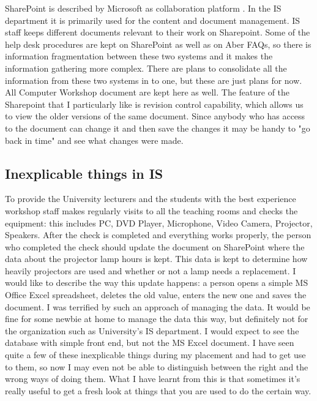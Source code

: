 \documentclass[10pt,a4paper,headinclude=true,twoside]{report}
\begin{document}
SharePoint is described by Microsoft as collaboration platform \cite{Sharepoint}. In the IS department it is primarily used  for the content and document management. IS staff keeps different documents relevant to their work on Sharepoint. Some of the help desk procedures are kept on SharePoint as well as on Aber FAQs, so there is information fragmentation between these two systems and it makes the information gathering more complex. There are plans to consolidate all the information from these two systems in to one, but these are just plans for now. All Computer Workshop document are kept here as well. The feature of the Sharepoint that I particularly like is revision control capability, which allows us to view the older versions of the same document. Since anybody who has access to the document can change it and then save the changes it may be handy to "go back in time" and see what changes were made.

\subsection{Inexplicable things in IS}
\label{sec:stupid}
To provide the University lecturers and the students with the best experience workshop staff makes regularly visits to all the teaching rooms and checks the equipment: this includes PC, DVD Player, Microphone, Video Camera, Projector, Speakers. After the check is completed and everything works properly, the person who completed the check should update the document on SharePoint where the data about the projector lamp hours is kept. This data is kept to determine how heavily projectors are used and whether or not a lamp needs a replacement. I would like to describe the way this update happens: a person opens a simple MS Office Excel spreadsheet, deletes the old value, enters the new one and saves the document. I was terrified by such an approach of managing the data. It would be fine for some newbie at home to manage the data this way, but definitely not for the organization such as University's IS department. I would expect to see the database with simple front end, but not the MS Excel document. I have seen quite a few of these inexplicable things during my placement and had to get use to them, so now I may even not be able to distinguish between the right and the wrong ways of doing them. What I have learnt from this is that sometimes it's really useful to get a fresh look at things that you are used to do the certain way.      
\end{document}
